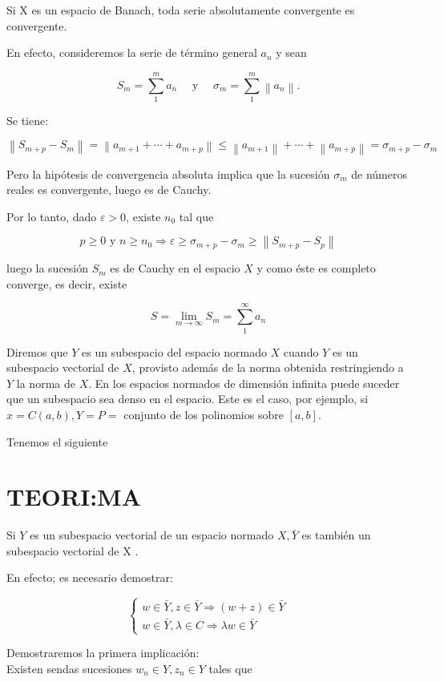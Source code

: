 \documentclass[10pt]{article}
\theoremstyle{plain}
\theoremstyle{definition}
\theoremstyle{remark}
\begin{document}
Si X es un espacio de Banach, toda serie absolutamente convergente es convergente.

En efecto, consideremos la serie de término general $a_{n}$ y sean

$$
S_{m}=\sum_{1}^{m} a_{n} \quad \text { y } \quad \sigma_{m}=\sum_{1}^{m}\left\|a_{n}\right\| .
$$

Se tiene:

$$
\left\|S_{m+p}-S_{m}\right\|=\left\|a_{m+1}+\cdots+a_{m+p}\right\| \leqslant\left\|a_{m+1}\right\|+\cdots+\left\|a_{m+p}\right\|=\sigma_{m+p}-\sigma_{m}
$$

Pero la hipótesis de convergencia absoluta implica que la sucesión $\sigma_{m}$ de números reales es convergente, luego es de Cauchy.

Por lo tanto, dado $\varepsilon>0$, existe $n_{0}$ tal que

$$
p \geqslant 0 \text { y } n \geqslant n_{0} \Rightarrow \varepsilon \geqslant \sigma_{m+p}-\sigma_{m} \geqslant\left\|S_{m+p}-S_{p}\right\|
$$

luego la sucesión $S_{m}$ es de Cauchy en el espacio $X$ y como éste es completo converge, es decir, existe

$$
S=\lim _{m \rightarrow \infty} S_{m}=\sum_{1}^{\infty} a_{n}
$$

Diremos que $Y$ es un subespacio del espacio normado $X$ cuando $Y$ es un subespacio vectorial de $X$, provisto además de la norma obtenida restringiendo a $Y$ la norma de $X$. En los espacios normados de dimensión infinita puede suceder que un subespacio sea denso en el espacio. Este es el caso, por ejemplo, si $x=C(a, b), Y=P=$ conjunto de los polinomios sobre $[a, b]$.

Tenemos el siguiente

\section*{TEORI:MA}
Si $Y$ es un subespacio vectorial de un espacio normado $X, \bar{Y}$ es también un subespacio vectorial de X .

En efecto; es necesario demostrar:

$$
\left\{\begin{array}{l}
w \in \bar{Y}, z \in \bar{Y} \Rightarrow(w+z) \in \bar{Y} \\
w \in \bar{Y}, \lambda \in C \Rightarrow \lambda w \in \bar{Y}
\end{array}\right.
$$

Demostraremos la primera implicación:\\
Existen sendas sucesiones $w_{n} \in Y, z_{n} \in Y$ tales que
\end{document}
